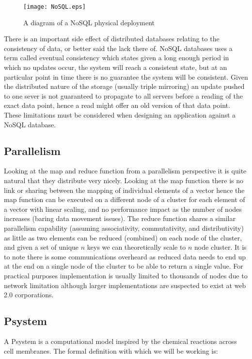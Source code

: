 \documentclass[runningheads]{llncs}
\begin{document}
\begin{figure}
\texttt{[image: NoSQL.eps]}
\caption{A diagram of a NoSQL physical deployment}
\end{figure}

There is an important side effect of distributed databases relating to the consistency of data, or better said the lack there of. NoSQL databases uses a term called eventual consistency which states given a long enough period in which no updates occur, the system will reach a consistent state, but at an particular point in time there is no guarantee the system will be consistent. Given the distributed nature of the storage (usually triple mirroring) an update pushed to one sever is not guaranteed to propagate to all servers before a reading of the exact data point, hence a read might offer an old version of that data point. These limitations must be considered when designing an application against a NoSQL database.   

\subsection{Parallelism}

Looking at the map and reduce function from a parallelism perspective it is quite natural that they distribute very nicely. Looking at the map function there is no link or sharing between the mapping of individual elements of a vector hence the map function can be executed on a different node of a cluster for each element of a vector with linear scaling, and no performance impact as the number of nodes increases (baring data movement issues). The reduce function shares a similar parallelism capability (assuming associativity, commutativity, and distributivity) as little as two elements can be reduced (combined) on each node of the cluster, and given a set of unique $n$ keys we can theoretically scale to $n$ node cluster. It is to note there is some communications overheard as reduced data needs to end up at the end on a single node of the cluster to be able to return a single value.  For practical purposes implementation is usually limited to thousands of nodes due to network limitation although larger implementations are suspected to exist at web 2.0 corporations.

\subsection{Psystem}

A Psystem is a computational model inspired by the chemical reactions across cell membranes. The formal definition with which we will be working is:
\end{document}
